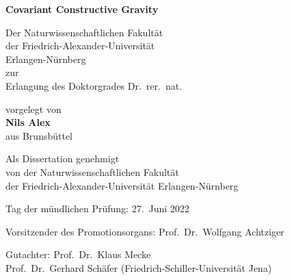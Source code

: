 \begin{ngerman}
  \begin{titlepage}
    \centering
    \vspace*{3cm}
    {\huge\sffamily\bfseries Covariant Constructive Gravity\par}
    \vfill
    {Der Naturwissenschaftlichen Fakultät\\
     der Friedrich-Alexander-Universität\\
     Erlangen-Nürnberg\\
     zur\\
   Erlangung des Doktorgrades Dr.~rer.~nat.\par}
   \vfill
   {vorgelegt von \\
    {\bfseries Nils Alex} \\
    aus Brunsbüttel}
   \vfill
   \vspace*{3cm}
   \newpage
   \raggedright
   \pagestyle{empty}
   {Als Dissertation genehmigt\\
    von der Naturwissenschaftlichen Fakultät\\
    der Friedrich-Alexander-Universität Erlangen-Nürnberg\par}
   \vfill
   {Tag der mündlichen Prüfung: 27.\ Juni 2022\par}
   {Vorsitzender des Promotionsorgans: Prof.\ Dr.\ Wolfgang Achtziger\par}
   {Gutachter: Prof.\ Dr.\ Klaus Mecke \\ \hphantom{Gutachter: }Prof.\ Dr.\ Gerhard Schäfer (Friedrich-Schiller-Universität Jena)}
   \newpage
   \pagestyle{empty}
   \vspace*{4.5cm}
  \end{titlepage}
\end{ngerman}

% 
